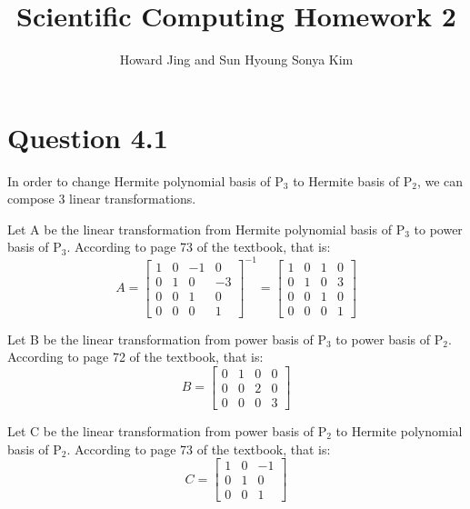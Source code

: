 \documentclass[11pt]{amsart}
\title{Scientific Computing Homework 2}
\author{Howard Jing and Sun Hyoung Sonya Kim}
\begin{document}
\maketitle
\section*{Question 4.1}
In order to change Hermite polynomial basis of P$_{3}$ to Hermite basis of P$_{2}$, we can compose 3 linear transformations.

Let A be the linear transformation from Hermite polynomial basis of P$_{3}$ to power basis of P$_{3}$. According to page 73 of the textbook, that is:
 \[
A = \begin{bmatrix}
1 & 0 & -1& 0 \\
0 & 1 & 0 & -3 \\
0 & 0 & 1 & 0 \\
0 & 0 & 0 & 1
\end{bmatrix}^{-1}  = 
\begin{bmatrix}
1 & 0 & 1& 0 \\
0 & 1 & 0 & 3 \\
0 & 0 & 1 & 0 \\
0 & 0 & 0 & 1
\end{bmatrix}
\]

Let B be the linear transformation from power basis of P$_{3}$ to power basis of P$_{2}$. According to page 72 of the textbook, that is:
\[
B = \begin{bmatrix}
0 & 1 & 0& 0 \\
0 & 0 & 2 & 0 \\
0 & 0 & 0 & 3 
\end{bmatrix}
\]

Let C be the linear transformation from power basis of P$_{2}$ to Hermite polynomial basis of  P$_{2}$. According to page 73 of the textbook, that is:
\[
C = \begin{bmatrix}
1 & 0 & -1 \\
0 & 1 & 0 \\
0 & 0 & 1
\end{bmatrix}
\]
\end{document}
